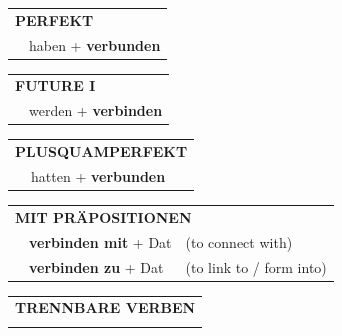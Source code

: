 \documentclass[10pt,a4paper]{revtex4-2}
\begin{document}
\begin{verbbox}
\vspace{10pt}

\begin{tabular}{rl}
\multicolumn{2}{l}{\textbf{PERFEKT}}\\
& haben + \textbf{verbunden}\\
\end{tabular}
\hfill
\begin{tabular}{rl}
\multicolumn{2}{l}{\textbf{FUTURE I}}\\
& werden + \textbf{verbinden}\\
\end{tabular}
\hfill
\begin{tabular}{rl}
\multicolumn{2}{l}{\textbf{PLUSQUAMPERFEKT}}\\
& hatten + \textbf{verbunden}\\
\end{tabular}

\vspace{10pt}

\begin{tabular}{lll}
\multicolumn{3}{l}{\textbf{MIT PRÄPOSITIONEN}}\\
& \textbf{verbinden mit} + Dat & (to connect with)\\
& \textbf{verbinden zu} + Dat & (to link to / form into)\\
\end{tabular}
\hfill
\begin{tabular}{lll}
\multicolumn{3}{l}{\textbf{TRENNBARE VERBEN}}\\
\vspace{20pt}
\end{tabular}
\vspace{-5pt}
\end{verbbox}
\end{document}
